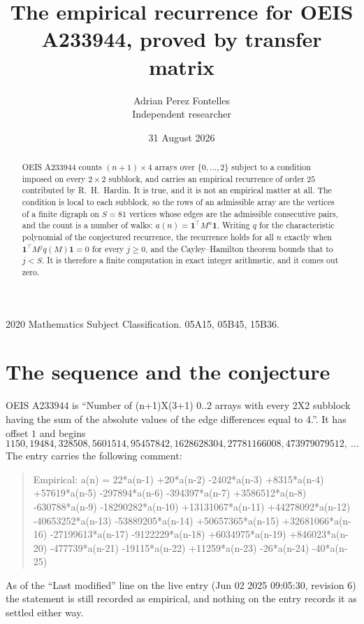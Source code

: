 \documentclass[11pt,a4paper]{article}
\title{The empirical recurrence for OEIS A233944, proved by transfer matrix}
\author{Adrian Perez Fontelles\\ \small Independent researcher}
\date{31 August 2026}
\theoremstyle{plain}
\theoremstyle{definition}
\begin{document}
\maketitle

\begin{abstract}
OEIS A233944 counts $(n+1)\times4$ arrays over $\{0,\dots,2\}$ subject to a condition imposed on
every $2\times2$ subblock, and carries an empirical recurrence of order $25$ contributed
by R.~H.~Hardin. It is true, and it is not an empirical matter at all. The condition is local
to each subblock, so the rows of an admissible array are the vertices of a finite digraph
on $S=81$ vertices whose edges are the admissible consecutive pairs, and the count is a
number of walks: $a(n)=\mathbf{1}^{\!\top}M^{n}\mathbf{1}$. Writing $q$
for the characteristic polynomial of the conjectured recurrence, the recurrence holds for all
$n$ exactly when $\mathbf{1}^{\!\top}M^{j}q(M)\mathbf{1}=0$ for every $j\ge0$, and the
Cayley--Hamilton theorem bounds that to $j<S$. It is therefore a finite computation in exact
integer arithmetic, and it comes out zero.
\end{abstract}

\noindent\small 2020 Mathematics Subject Classification. 05A15, 05B45, 15B36.\normalsize

\section{The sequence and the conjecture}

OEIS A233944 is ``Number of (n+1)X(3+1) 0..2 arrays with every 2X2 subblock having the sum of the absolute values of the edge differences equal to 4.''. It has offset $1$ and begins
\[
1150, 19484, 328508, 5601514, 95457842, 1628628304, 27781166008, 473979079512,\ \dots
\]
The entry carries the following comment:
\begin{quote}\small
Empirical: a(n) = 22*a(n-1) +20*a(n-2) -2402*a(n-3) +8315*a(n-4) +57619*a(n-5) -297894*a(n-6) -394397*a(n-7) +3586512*a(n-8) -630788*a(n-9) -18290282*a(n-10) +13131067*a(n-11) +44278092*a(n-12) -40653252*a(n-13) -53889205*a(n-14) +50657365*a(n-15) +32681066*a(n-16) -27199613*a(n-17) -9122229*a(n-18) +6034975*a(n-19) +846023*a(n-20) -477739*a(n-21) -19115*a(n-22) +11259*a(n-23) -26*a(n-24) -40*a(n-25)
\end{quote}
As of the ``Last modified'' line on the live entry (Jun 02 2025 09:05:30, revision 6) the statement is
still recorded as empirical, and nothing on the entry records it as settled either way.
\end{document}

